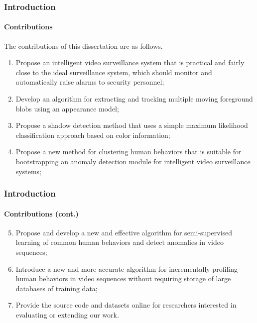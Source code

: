 \begin{frame}
    \frametitle{Introduction}
    \framesubtitle{Contributions}

    The contributions of this dissertation are as follows.
    \begin{enumerate}
        \item Propose an intelligent video surveillance system that 
            is practical and fairly close to the ideal surveillance 
            system, which should monitor and automatically raise 
            alarms to security personnel; 
        \item Develop an algorithm for extracting and tracking 
            multiple moving foreground blobs using an appearance model; 
        \item Propose a shadow detection method that uses a simple 
            maximum likelihood classification approach based on color 
            information; 
        \item Propose a new method for clustering human behaviors 
            that is suitable for bootstrapping an 
            anomaly detection module for intelligent video surveillance 
            systems; 
    \end{enumerate}

\end{frame}


\begin{frame}
    \frametitle{Introduction}
    \framesubtitle{Contributions (cont.)}

    \begin{enumerate}
        \setcounter{enumi}{4}
        \item Propose and develop a new and effective algorithm 
            for semi-supervised learning of common human behaviors 
            and detect anomalies in video sequences; 
        \item Introduce a new and more accurate algorithm for 
            incrementally profiling human behaviors
            in video sequences without requiring storage of large databases 
            of training data; 
        \item Provide the source code and datasets online for researchers 
            interested in evaluating or
            extending our work.
    \end{enumerate}

\end{frame}

